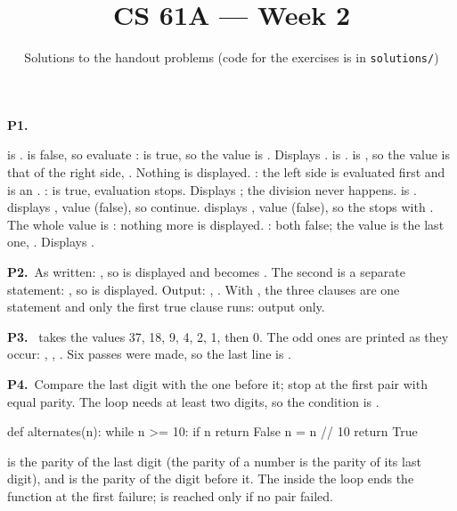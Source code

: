 \documentclass[10pt]{scrartcl}
\title{CS 61A --- Week 2}
\subtitle{Solutions to the handout problems (code for the exercises is in \texttt{solutions/})}
\author{}\date{}\ihead{}
\begin{document}
\maketitle

\begin{prob}\textbf{P1.}
\begin{steps}
  \ii {} is .  is false, so evaluate :  is true, so the value is . Displays .
  \ii {} is .  is , so the value is that of the right side, . Nothing is displayed.
  \ii {}: the left side is evaluated first and is an .
  \ii {}:  is true, evaluation stops. Displays ; the division never happens.
  \ii {} is .  displays , value  (false), so continue.  displays , value  (false), so the  stops with . The whole value is : nothing more is displayed.
  \ii {}: both false; the value is the last one, . Displays .
\end{steps}
\end{prob}

\begin{prob}\textbf{P2.}\ As written: , so  is displayed and  becomes . The second  is a separate statement: , so  is displayed. Output: , . With , the three clauses are one statement and only the first true clause runs: output  only.
\end{prob}

\begin{prob}\textbf{P3.}\  takes the values 37, 18, 9, 4, 2, 1, then 0. The odd ones are printed as they occur: , , . Six passes were made, so the last line is .
\end{prob}

\begin{prob}\textbf{P4.}\ Compare the last digit with the one before it; stop at the first pair with equal parity. The loop needs at least two digits, so the condition is .
\begin{py}
def alternates(n):
    while n >= 10:
        if n %
            return False
        n = n // 10
    return True
\end{py}
 is the parity of the last digit (the parity of a number is the parity of its last digit), and  is the parity of the digit before it. The  inside the loop ends the function at the first failure;  is reached only if no pair failed.
\end{prob}
\end{document}
